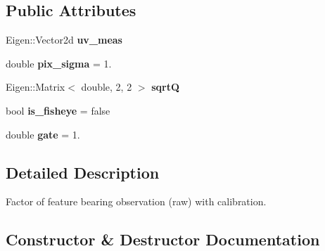\subsection*{Public Attributes}
\begin{DoxyCompactItemize}
\item 
\mbox{\label{classov__init_1_1Factor__ImageReprojCalib_a6b61d1e16eb2ea839386975477c6b0b0}} 
Eigen\+::\+Vector2d {\bfseries uv\+\_\+meas}
\item 
\mbox{\label{classov__init_1_1Factor__ImageReprojCalib_a54fe1639da58d8ca921d0bc812d59925}} 
double {\bfseries pix\+\_\+sigma} = 1.
\item 
\mbox{\label{classov__init_1_1Factor__ImageReprojCalib_a88e052fdf8160abc2289dbcceb7d1432}} 
Eigen\+::\+Matrix$<$ double, 2, 2 $>$ {\bfseries sqrtQ}
\item 
\mbox{\label{classov__init_1_1Factor__ImageReprojCalib_a8e139b85dac9c971f1764999c4f8880f}} 
bool {\bfseries is\+\_\+fisheye} = false
\item 
\mbox{\label{classov__init_1_1Factor__ImageReprojCalib_a97e1ebb6fdb6ab55c58235eb150b5b73}} 
double {\bfseries gate} = 1.
\end{DoxyCompactItemize}


\subsection{Detailed Description}
Factor of feature bearing observation (raw) with calibration. 

\subsection{Constructor \& Destructor Documentation}
\mbox{\label{classov__init_1_1Factor__ImageReprojCalib_aaecdb048ff86ec1621fc690adf6eb89a}} 
